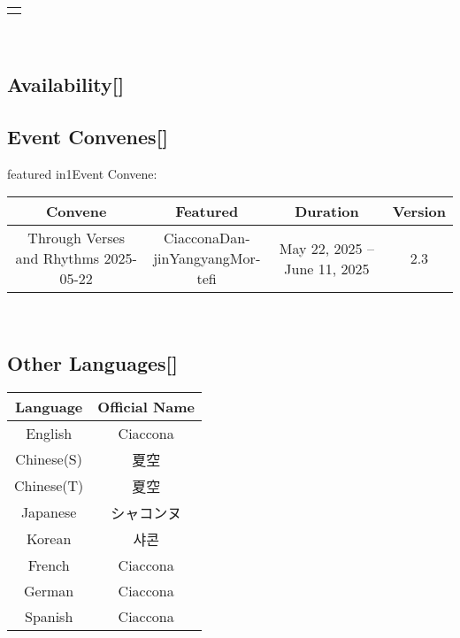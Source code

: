 \documentclass[a4paper,12pt]{article}
\begin{document}
\begin{tabular}{|c|} \hline
 \\
\end{tabular}\\ \par \vspace{0.5cm}

\subsection*{Availability[]}\n\n\subsection*{Event Convenes[]}\n\nCiacconais featured in1Event Convene:\\ \par \vspace{0.5cm}

\begin{tabular}{|c|c|c|c|} \hline
Convene & Featured & Duration & Version \\
 \hline
Through Verses and Rhythms 2025-05-22 & Ciac­conaDan­jinYang­yangMor­te­fi & May 22, 2025 – June 11, 2025 & 2.3 \\
\end{tabular}\\ \par \vspace{0.5cm}

\subsection*{Other Languages[]}\n\n\begin{tabular}{|c|c|} \hline
Language & Official Name \\
 \hline
English & Ciaccona \\
Chinese(S) & 夏空 \\
Chinese(T) & 夏空 \\
Japanese & シャコンヌ \\
Korean & 샤콘 \\
French & Ciaccona \\
German & Ciaccona \\
Spanish & Ciaccona \\
\end{tabular}\\ \par \vspace{0.5cm}
\end{document}
